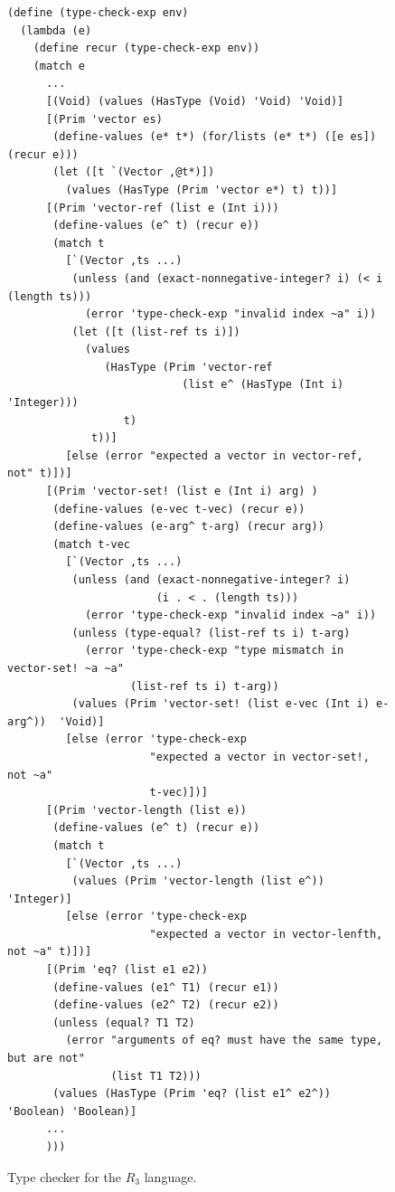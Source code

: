 \documentclass[11pt]{book}
\begin{document}
\begin{figure}[tp]
\begin{lstlisting}[basicstyle=\ttfamily\footnotesize]
(define (type-check-exp env)
  (lambda (e)
    (define recur (type-check-exp env))
    (match e
      ...
      [(Void) (values (HasType (Void) 'Void) 'Void)]
      [(Prim 'vector es)
       (define-values (e* t*) (for/lists (e* t*) ([e es]) (recur e)))
       (let ([t `(Vector ,@t*)])
         (values (HasType (Prim 'vector e*) t) t))]
      [(Prim 'vector-ref (list e (Int i)))
       (define-values (e^ t) (recur e))
       (match t
         [`(Vector ,ts ...)
          (unless (and (exact-nonnegative-integer? i) (< i (length ts)))
            (error 'type-check-exp "invalid index ~a" i))
          (let ([t (list-ref ts i)])
            (values
               (HasType (Prim 'vector-ref
                           (list e^ (HasType (Int i) 'Integer)))
                  t)
             t))]
         [else (error "expected a vector in vector-ref, not" t)])]
      [(Prim 'vector-set! (list e (Int i) arg) )
       (define-values (e-vec t-vec) (recur e))
       (define-values (e-arg^ t-arg) (recur arg))
       (match t-vec
         [`(Vector ,ts ...)
          (unless (and (exact-nonnegative-integer? i)
                       (i . < . (length ts)))
            (error 'type-check-exp "invalid index ~a" i))
          (unless (type-equal? (list-ref ts i) t-arg)
            (error 'type-check-exp "type mismatch in vector-set! ~a ~a" 
                   (list-ref ts i) t-arg))
          (values (Prim 'vector-set! (list e-vec (Int i) e-arg^))  'Void)]
         [else (error 'type-check-exp
                      "expected a vector in vector-set!, not ~a"
                      t-vec)])]
      [(Prim 'vector-length (list e))
       (define-values (e^ t) (recur e))
       (match t
         [`(Vector ,ts ...)
          (values (Prim 'vector-length (list e^))  'Integer)]
         [else (error 'type-check-exp
                      "expected a vector in vector-lenfth, not ~a" t)])]
      [(Prim 'eq? (list e1 e2))
       (define-values (e1^ T1) (recur e1))
       (define-values (e2^ T2) (recur e2))
       (unless (equal? T1 T2)
         (error "arguments of eq? must have the same type, but are not"
                (list T1 T2)))
       (values (HasType (Prim 'eq? (list e1^ e2^)) 'Boolean) 'Boolean)]
      ...
      )))
\end{lstlisting}
\caption{Type checker for the $R_3$ language.}
\label{fig:type-check-R3}
\end{figure}
\end{document}
